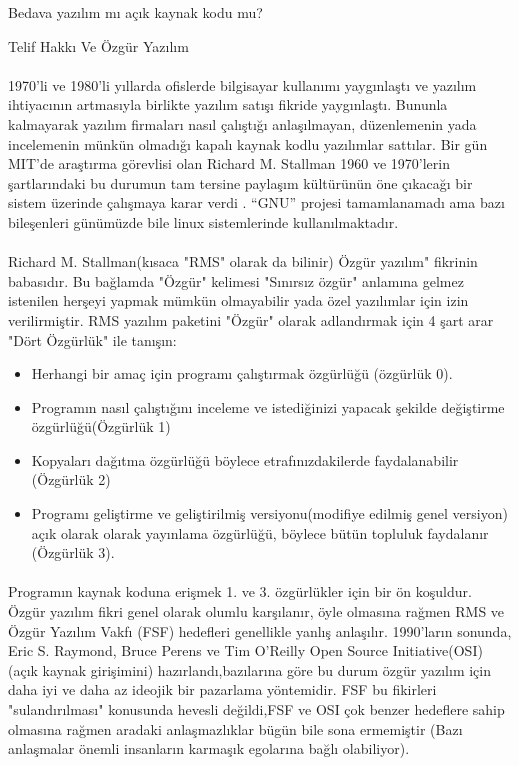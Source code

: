 \documentclass[10pt,a5paper]{book}
\begin{document}
\begin{section}{Bedava yazılım mı açık kaynak kodu mu?}
\begin{subsection}{Telif Hakkı Ve Özgür Yazılım}
\paragraph{}{1970'li ve 1980'li yıllarda ofislerde bilgisayar kullanımı yaygınlaştı ve yazılım ihtiyacının artmasıyla birlikte yazılım satışı fikride yaygınlaştı. Bununla kalmayarak yazılım firmaları nasıl çalıştığı anlaşılmayan, düzenlemenin yada incelemenin münkün olmadığı kapalı kaynak kodlu yazılımlar sattılar. Bir gün MIT'de araştırma görevlisi olan Richard M. Stallman 1960 ve 1970'lerin şartlarındaki bu durumun tam tersine paylaşım kültürünün öne çıkacağı bir sistem üzerinde çalışmaya karar verdi . “GNU” projesi tamamlanamadı ama bazı bileşenleri günümüzde bile linux sistemlerinde kullanılmaktadır.}
\paragraph{}{Richard M. Stallman(kısaca "RMS" olarak da bilinir) Özgür yazılım" fikrinin babasıdır. Bu bağlamda "Özgür" kelimesi "Sınırsız özgür" anlamına gelmez istenilen herşeyi yapmak mümkün olmayabilir yada özel yazılımlar için izin verilirmiştir. RMS yazılım paketini "Özgür" olarak adlandırmak için 4 şart arar  "Dört Özgürlük" ile tanışın:}
\begin{itemize}
 \item Herhangi bir amaç için programı çalıştırmak  özgürlüğü (özgürlük 0).
 \item Programın nasıl çalıştığını inceleme ve istediğinizi yapacak şekilde değiştirme özgürlüğü(Özgürlük 1)
 \item Kopyaları dağıtma özgürlüğü böylece etrafınızdakilerde faydalanabilir (Özgürlük 2)
 \item Programı geliştirme ve geliştirilmiş versiyonu(modifiye edilmiş genel versiyon) açık olarak olarak yayınlama özgürlüğü, böylece bütün topluluk
faydalanır (Özgürlük 3).
 \end{itemize}
\paragraph{}{Programın kaynak koduna erişmek 1. ve 3. özgürlükler için bir ön koşuldur. Özgür yazılım fikri genel olarak olumlu karşılanır, öyle olmasına rağmen RMS ve Özgür Yazılım Vakfı (FSF) hedefleri genellikle yanlış anlaşılır. 1990'ların sonunda, Eric S. Raymond, Bruce Perens ve Tim O'Reilly Open Source Initiative(OSI)(açık kaynak girişimini) hazırlandı,bazılarına göre bu durum özgür yazılım için daha iyi ve daha az ideojik bir pazarlama yöntemidir. FSF bu fikirleri "sulandırılması" konusunda hevesli değildi,FSF ve OSI çok benzer hedeflere sahip olmasına rağmen aradaki anlaşmazlıklar bügün bile sona ermemiştir (Bazı anlaşmalar önemli insanların karmaşık egolarına bağlı olabiliyor).}

\end{subsection}
\end{section}
\end{document}
